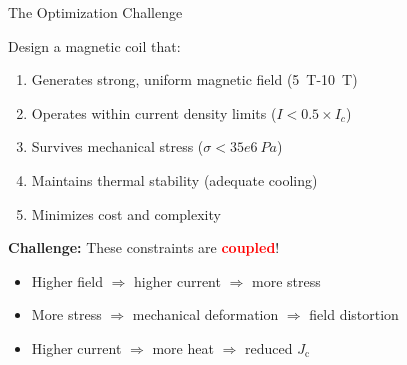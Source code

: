 \documentclass[aspectratio=169,xcolor={table,dvipsnames}]{beamer}
\newcommand{\Tesla}[1]{#1~T}
\newcommand{\Pascal}[1]{#1~Pa}
\newcommand{\highlight}[1]{\textcolor{red}{\textbf{#1}}}
\newcommand{\Jc}{J_\text{c}}
\begin{document}
\begin{frame}{The Optimization Challenge}
    \begin{block}{Design a magnetic coil that:}
        \begin{enumerate}
            \item Generates strong, uniform magnetic field (\Tesla{5}-\Tesla{10})
            \item Operates within current density limits ($I < 0.5 \times I_c$)
            \item Survives mechanical stress ($\sigma < \Pascal{35e6}$)
            \item Maintains thermal stability (adequate cooling)
            \item Minimizes cost and complexity
        \end{enumerate}
    \end{block}
    
    \vspace{0.5cm}
    \textbf{Challenge:} These constraints are \highlight{coupled}!
    \begin{itemize}
        \item Higher field $\Rightarrow$ higher current $\Rightarrow$ more stress
        \item More stress $\Rightarrow$ mechanical deformation $\Rightarrow$ field distortion
        \item Higher current $\Rightarrow$ more heat $\Rightarrow$ reduced $\Jc$
    \end{itemize}
\end{frame}
\end{document}
